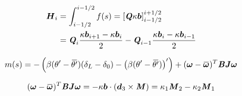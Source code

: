 \begin{equation}
	\begin{aligned}
	\boldsymbol{H}_i 
	&= \int_{i-1/2}^{i-1/2} f(s)  = \left[\boldsymbol{\mathit{Q}} \kappa\boldsymbol{b} \right]_{i-1/2}^{i+1/2} \\
	&= \boldsymbol{\mathit{Q}}_i \frac{ \kappa\boldsymbol{b}_{i+1} -  \kappa\boldsymbol{b}_i}{2}
	- \boldsymbol{\mathit{Q}}_{i-1} \frac{ \kappa\boldsymbol{b}_{i} -  \kappa\boldsymbol{b}_{i-1}}{2}
	\end{aligned}
\end{equation}


\begin{equation}
	m(s) = - \left(\beta(\theta' -{\overbar{\theta'}})(\delta_L-\delta_0) - \left(\beta(\theta' -{\overbar{\theta'}})\right)'\right) + (\vect{\omega} - \overbar{\vect{\omega}})^T \mat{B} \mat{J}\vect{\omega}
\end{equation}

\begin{equation}
	(\vect{\omega} - \overbar{\vect{\omega}})^T \mat{B} \mat{J}\vect{\omega} 
	 = - \kappa\vect{b} \cdot (\vect{d}_3 \times \mat{M})
	 = \kappa_1 \mat{M}_2 -  \kappa_2 \mat{M}_1
\end{equation}



